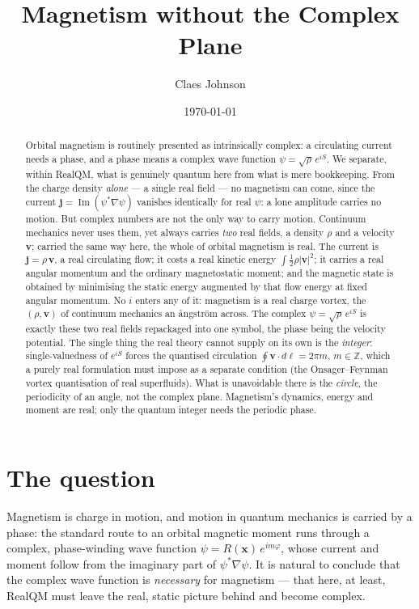 \documentclass[11pt]{article}
\title{Magnetism without the Complex Plane}
\author[1]{Claes Johnson}
\affil[1]{KTH Royal Institute of Technology, SE-100 44 Stockholm, Sweden \\
\texttt{claesjohnson@gmail.com}}
\date{\today}
\begin{document}
\maketitle

\begin{abstract}
Orbital magnetism is routinely presented as intrinsically complex: a circulating current needs a phase, and a
phase means a complex wave function $\psi=\sqrt\rho\,e^{iS}$. We separate, within RealQM, what is genuinely
quantum here from what is mere bookkeeping. From the charge density \emph{alone} --- a single real field --- no
magnetism can come, since the current $\mathbf j=\operatorname{Im}(\psi^*\nabla\psi)$ vanishes identically for
real $\psi$: a lone amplitude carries no motion. But complex numbers are not the only way to carry motion.
Continuum mechanics never uses them, yet always carries \emph{two} real fields, a density $\rho$ and a velocity
$\mathbf v$; carried the same way here, the whole of orbital magnetism is real. The current is
$\mathbf j=\rho\,\mathbf v$, a real circulating flow; it costs a real kinetic energy $\int\tfrac12\rho|\mathbf
v|^2$; it carries a real angular momentum and the ordinary magnetostatic moment; and the magnetic state is
obtained by minimising the static energy augmented by that flow energy at fixed angular momentum. No $i$ enters
any of it: magnetism is a real charge vortex, the $(\rho,\mathbf v)$ of continuum mechanics an
\aa ngstr\"om across. The complex $\psi=\sqrt\rho\,e^{iS}$ is exactly these two real fields repackaged into one
symbol, the phase being the velocity potential. The single thing the real theory cannot supply on its own is
the \emph{integer}: single-valuedness of $e^{iS}$ forces the quantised circulation $\oint\mathbf v\cdot
d\boldsymbol\ell=2\pi m$, $m\in\mathbb Z$, which a purely real formulation must impose as a separate condition
(the Onsager--Feynman vortex quantisation of real superfluids). What is unavoidable there is the \emph{circle},
the periodicity of an angle, not the complex plane. Magnetism's dynamics, energy and moment are real; only the
quantum integer needs the periodic phase.
\end{abstract}


\section{The question}

Magnetism is charge in motion, and motion in quantum mechanics is carried by a phase: the standard route to an
orbital magnetic moment runs through a complex, phase-winding wave function $\psi=R(\mathbf x)\,e^{im\varphi}$,
whose current and moment follow from the imaginary part of $\psi^*\nabla\psi$. It is natural to conclude that
the complex wave function is \emph{necessary} for magnetism --- that here, at least, RealQM must leave the real,
static picture behind and become complex.
\end{document}

